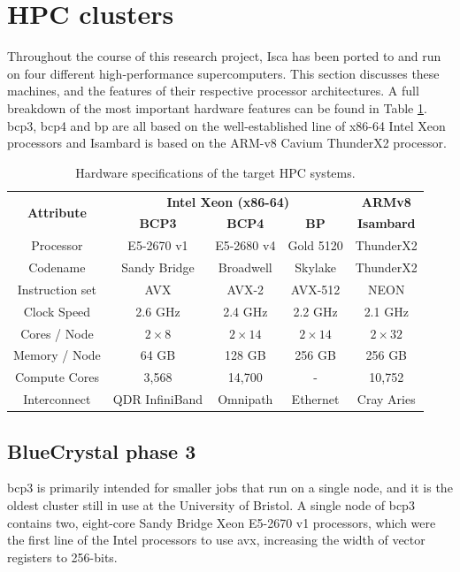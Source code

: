 \documentclass[a4paper,11pt]{report}
\begin{document}
\section{HPC clusters}
Throughout the course of this research project, Isca has been ported to and run on four different high-performance supercomputers. This section discusses these machines, and the features of their respective processor architectures. A full breakdown of the most important hardware features can be found in Table \ref{tbl:hardware}. \gls{bcp3}, \gls{bcp4} and \gls{bp} are all based on the well-established line of x86-64 Intel Xeon processors and Isambard is based on the ARM-v8 Cavium ThunderX2 processor.
\begin{table}[!ht]
\centering
\caption[Hardware specifications of the target HPC systems]{Hardware specifications of the target HPC systems. }
\begin{tabular}{@{\extracolsep{4pt}}ccccc}
\toprule 
\multirow{2}{*}{\textbf{Attribute}} & \multicolumn{3}{c}{\textbf{Intel Xeon (x86-64)}} & \multicolumn{1}{c}{\textbf{ARMv8}}\\

				\cmidrule(lr){2-4} \cmidrule(lr){5-5}

 				& {\textbf{BCP3}} 	& {\textbf{BCP4}} 		& {\textbf{BP}} 		& {\textbf{Isambard}} \\
\midrule
Processor	   		& E5-2670 v1 		& E5-2680 v4			& Gold 5120			& ThunderX2	\\
Codename            	& Sandy Bridge	        & Broadwell         		& Skylake       		   	& ThunderX2   	\\
Instruction set		& AVX			& AVX-2				& AVX-512			& NEON		\\
Clock Speed	   	& 2.6 GHz		    	& 2.4 GHz				& 2.2 GHz				&  2.1 GHz 	\\
Cores / Node		& $2\times8$		& $2\times14$			& $2 \times 14$			& $2\times32$	\\
Memory / Node		& 64 GB			& 128 GB				& 256 GB					& 256 GB		\\
Compute Cores		& 3,568		    	&14,700				& -					& 10,752 		\\
Interconnect		&  QDR InfiniBand	& Omnipath			& Ethernet			& Cray Aries	\\
\bottomrule
\end{tabular}
\label{tbl:hardware}
\end{table}

\subsection{BlueCrystal phase 3}
\gls{bcp3} is primarily intended for smaller jobs that run on a single node, and it is the oldest cluster still in use at the University of Bristol. A single node of \gls{bcp3} contains two, eight-core Sandy Bridge Xeon E5-2670 v1 processors, which were the first line of the Intel processors to use \gls{avx}, increasing the width of vector registers to 256-bits. 
\end{document}
